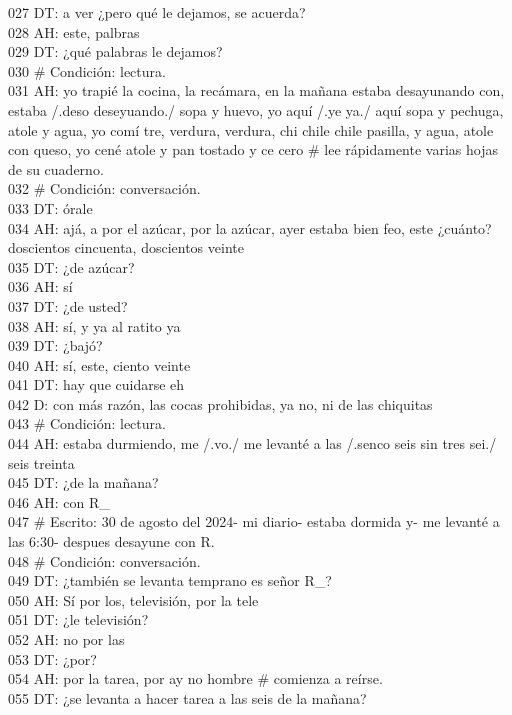 027 DT: a ver ¿pero qué le dejamos, se acuerda?\\
028 AH: este, palbras\\
029 DT: ¿qué palabras le dejamos?\\
030 \# Condición: lectura.\\
031 AH: yo trapié la cocina, la recámara, en la mañana estaba desayunando con, estaba /.deso deseyuando./ sopa y huevo, yo aquí /.ye ya./ aquí sopa y pechuga, atole y agua, yo comí tre, verdura, verdura, chi chile chile pasilla, y agua, atole con queso, yo cené atole y pan tostado y ce cero \# lee rápidamente varias hojas de su cuaderno.\\
032 \# Condición: conversación.\\
033 DT: órale\\
034 AH: ajá, a por el azúcar, por la azúcar, ayer estaba bien feo, este ¿cuánto? doscientos cincuenta, doscientos veinte\\
035 DT: ¿de azúcar?\\
036 AH: sí\\
037 DT: ¿de usted?\\
038 AH: sí, y ya al ratito ya\\
039 DT: ¿bajó?\\
040 AH: sí, este, ciento veinte\\
041 DT: hay que cuidarse eh\\
042 D: con más razón, las cocas prohibidas, ya no, ni de las chiquitas\\
043 \# Condición: lectura.\\
044 AH: estaba durmiendo, me /.vo./ me levanté a las /.senco seis sin tres sei./ seis treinta\\
045 DT: ¿de la mañana?\\
046 AH: con R\_\\
047 \# Escrito: 30 de agosto del 2024- mi diario- estaba dormida  y- me levanté a las 6:30- despues desayune con R.\\
048 \# Condición: conversación.\\
049 DT: ¿también se levanta temprano es señor R\_?\\
050 AH: Sí por los, televisión, por la tele\\
051 DT: ¿le televisión?\\
052 AH: no por las\\
053 DT: ¿por?\\
054 AH: por la tarea, por ay no hombre \# comienza a reírse.\\
055 DT: ¿se levanta a hacer tarea a las seis de la mañana?\\
